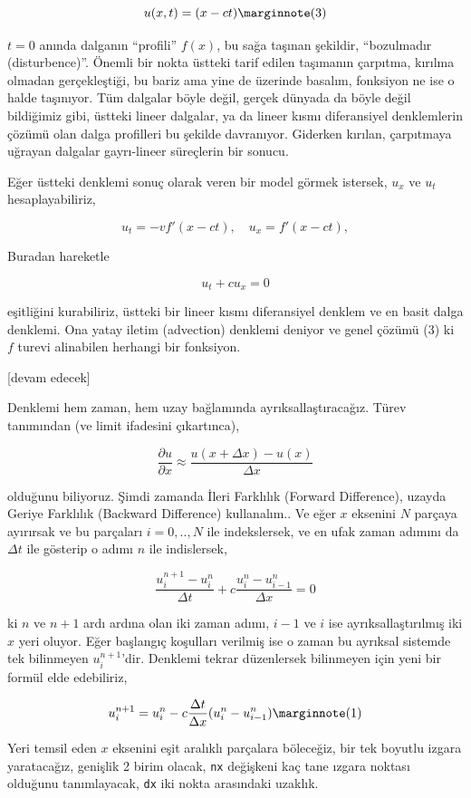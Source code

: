 \documentclass[12pt,fleqn]{article}\usepackage{../../common}
\begin{document}
$$
u(x,t) = (x - ct)
\mlabel{3}
$$

$t=0$ anında dalganın ``profili'' $f(x)$, bu sağa taşınan şekildir, ``bozulmadır
(disturbence)''. Önemli bir nokta üstteki tarif edilen taşımanın çarpıtma,
kırılma olmadan gerçekleştiği, bu bariz ama yine de üzerinde basalım, fonksiyon
ne ise o halde taşınıyor. Tüm dalgalar böyle değil, gerçek dünyada da böyle
değil bildiğimiz gibi, üstteki lineer dalgalar, ya da lineer kısmı diferansiyel
denklemlerin çözümü olan dalga profilleri bu şekilde davranıyor. Giderken
kırılan, çarpıtmaya uğrayan dalgalar gayrı-lineer süreçlerin bir sonucu.

Eğer üstteki denklemi sonuç olarak veren bir model görmek istersek, $u_x$ ve
$u_t$ hesaplayabiliriz,

$$
u_t = -v f'(x-ct), \quad  u_x = f'(x-ct), 
$$

Buradan hareketle

$$
u_t + c u_x = 0
$$

eşitliğini kurabiliriz, üstteki bir lineer kısmı diferansiyel denklem ve en
basit dalga denklemi. Ona yatay iletim (advection) denklemi deniyor ve genel
çözümü (3) ki $f$ turevi alinabilen herhangi bir fonksiyon.


[devam edecek]




Denklemi hem zaman, hem uzay bağlamında ayrıksallaştıracağız. Türev tanımından
(ve limit ifadesini çıkartınca),

$$
\frac{\partial u}{\partial x} \approx
\frac{u(x+\Delta x) - u(x)}{\Delta x}
$$

olduğunu biliyoruz. Şimdi zamanda İleri Farklılık (Forward Difference), uzayda
Geriye Farklılık (Backward Difference) kullanalım.. Ve eğer $x$ eksenini $N$
parçaya ayırırsak ve bu parçaları $i=0,..,N$ ile indekslersek, ve en ufak zaman
adımını da $\Delta t$ ile gösterip o adımı $n$ ile indislersek,

$$
\frac{u_i^{n+1} - u_i^n}{\Delta t} + c \frac{u_i^{n} - u_{i-1}^n}{\Delta x} = 0
$$

ki $n$ ve $n+1$ ardı ardına olan iki zaman adımı, $i-1$ ve $i$ ise
ayrıksallaştırılmış iki $x$ yeri oluyor. Eğer başlangıç koşulları verilmiş ise o
zaman bu ayrıksal sistemde tek bilinmeyen $u_i^{n+1}$'dir. Denklemi tekrar
düzenlersek bilinmeyen için yeni bir formül elde edebiliriz,

$$
u_i^{n+1} = u_i^n - c \frac{\Delta t}{\Delta x} ( u_i^n - u_{i-1}^n )
\mlabel{1}
$$

Yeri temsil eden $x$ eksenini eşit aralıklı parçalara böleceğiz, bir tek boyutlu
izgara yaratacağız, genişlik 2 birim olacak, \verb!nx! değişkeni kaç tane ızgara
noktası olduğunu tanımlayacak, \verb!dx! iki nokta arasındaki uzaklık.
\end{document}
